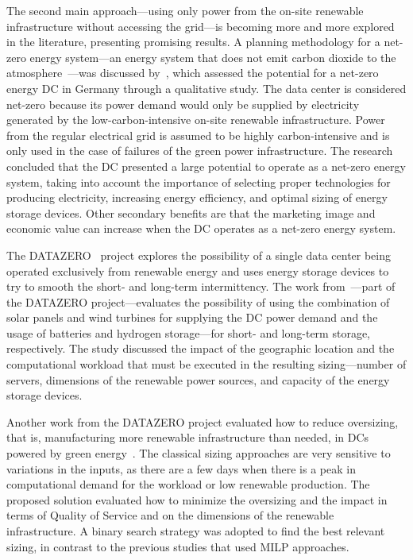 The second main approach---using only power from the on-site renewable infrastructure without accessing the grid---is becoming more and more explored in the literature, presenting promising results. A planning methodology for a net-zero energy system---an energy system that does not emit carbon dioxide to the atmosphere~\cite{netzero_energy_system}---was discussed by~\citet{Richter2021_netzero_dcs}, which assessed the potential for a net-zero energy DC in Germany through a qualitative study. The data center is considered net-zero because its power demand would only be supplied by electricity generated by the low-carbon-intensive on-site renewable infrastructure. Power from the regular electrical grid is assumed to be highly carbon-intensive and is only used in the case of failures of the green power infrastructure. The research concluded that the DC presented a large potential to operate as a net-zero energy system, taking into account the importance of selecting proper technologies for producing electricity, increasing energy efficiency, and optimal sizing of energy storage devices. Other secondary benefits are that the marketing image and economic value can increase when the DC operates as a net-zero energy system. 

The DATAZERO~\citep{datazero} project explores the possibility of a single data center being operated exclusively from renewable energy and uses energy storage devices to try to smooth the short- and long-term intermittency. The work from~\citet{HADDAD2021100505}---part of the DATAZERO project---evaluates the possibility of using the combination of solar panels and wind turbines for supplying the DC power demand and the usage of batteries and hydrogen storage---for short- and long-term storage, respectively. The study discussed the impact of the geographic location and the computational workload that must be executed in the resulting sizing---number of servers, dimensions of the renewable power sources, and capacity of the energy storage devices.

Another work from the DATAZERO project evaluated how to reduce oversizing, that is, manufacturing more renewable infrastructure than needed, in DCs powered by green energy~\citep{manal2022}. The classical sizing approaches are very sensitive to variations in the inputs, as there are a few days when there is a peak in computational demand for the workload or low renewable production. The proposed solution evaluated how to minimize the oversizing and the impact in terms of Quality of Service and on the dimensions of the renewable infrastructure. A binary search strategy was adopted to find the best relevant sizing, in contrast to the previous studies that used MILP approaches.

